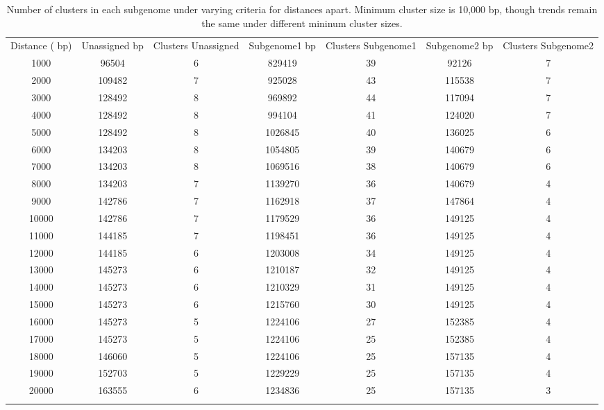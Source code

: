 \clearpage
\begin{table}[h!]
\caption{Number of clusters in each subgenome under varying criteria for distances apart.  Minimum cluster size is 10,000 bp, though trends remain the same under different mininum cluster sizes.}\label{supp.adjustclust} 
\begin{tabular}{ccccccc}
\hline\noalign{\smallskip}
Distance ( bp) &  Unassigned  bp &  Clusters Unassigned &  Subgenome1  bp &  Clusters Subgenome1 & Subgenome2  bp &  Clusters Subgenome2 \\\noalign{\smallskip}\hline\noalign{\smallskip}				
1000 & 96504 & 6 & 829419 & 39 & 92126 & 7\\
2000 & 109482 & 7 & 925028 & 43 & 115538 & 7\\
3000 & 128492 & 8 & 969892 & 44 & 117094 & 7\\
4000 & 128492 & 8 & 994104 & 41 & 124020 & 7\\
5000 & 128492 & 8 & 1026845 & 40 & 136025 & 6\\
6000 & 134203 & 8 & 1054805 & 39 & 140679 & 6\\
7000 & 134203 & 8 & 1069516 & 38 & 140679 & 6\\
8000 & 134203 & 7 & 1139270 & 36 & 140679 & 4\\
9000 & 142786 & 7 & 1162918 & 37 & 147864 & 4\\
10000 & 142786 & 7 & 1179529 & 36 & 149125 & 4\\
11000 & 144185 & 7 & 1198451 & 36 & 149125 & 4\\
12000 & 144185 & 6 & 1203008 & 34 & 149125 & 4\\
13000 & 145273 & 6 & 1210187 & 32 & 149125 & 4\\
14000 & 145273 & 6 & 1210329 & 31 & 149125 & 4\\
15000 & 145273 & 6 & 1215760 & 30 & 149125 & 4\\
16000 & 145273 & 5 & 1224106 & 27 & 152385 & 4\\
17000 & 145273 & 5 & 1224106 & 25 & 152385 & 4\\
18000 & 146060 & 5 & 1224106 & 25 & 157135 & 4\\
19000 & 152703 & 5 & 1229229 & 25 & 157135 & 4\\
20000 & 163555 & 6 & 1234836 & 25 & 157135 & 3\\
\noalign{\smallskip}\hline
\label{tab:suppvartandem} 
\end{tabular}
\end{table}



